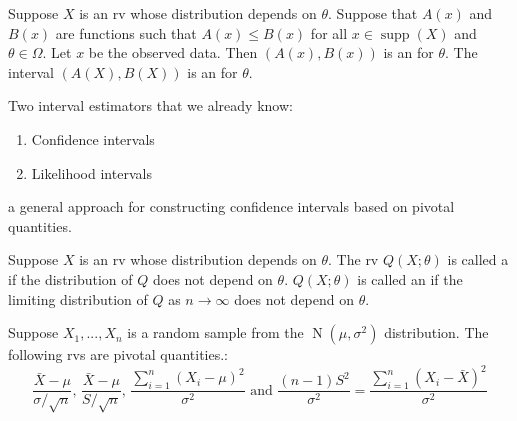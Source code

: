 \documentclass[notoc,notitlepage]{tufte-book}
\DeclareMathOperator{\Nor}{N }
\DeclareMathOperator{\supp}{supp }
\begin{document}
\begin{defn}
\label{defn:interval_estimators}
  Suppose $X$ is an rv whose distribution depends on $\theta$. Suppose that $A(x)$ and $B(x)$ are functions such that $A(x) \leq B(x)$ for all $x \in \supp(X)$ and $\theta \in \Omega$. Let $x$ be the observed data. Then $(A(x), B(x))$ is an  for $\theta$. The interval $(A(X), B(X))$ is an  for $\theta$.
\end{defn}

\begin{note}
  Two interval estimators that we already know:
  \begin{enumerate}
    \item Confidence intervals
    \item Likelihood intervals
  \end{enumerate}
\end{note}

 a general approach for constructing confidence intervals based on pivotal quantities.

\begin{defn}
\label{defn:pivotal_quantity}
  Suppose $X$ is an rv whose distribution depends on $\theta$. The rv $Q(X; \theta)$ is called a  if the distribution of $Q$ does not depend on $\theta$. $Q(X; \theta)$ is called an  if the limiting distribution of $Q$ as $n \to \infty$ does not depend on $\theta$.
\end{defn}

\begin{eg}[Example 6.16]\label{eg:6_16}
  Suppose $X_1, ..., X_n$ is a random sample from the $\Nor(\mu, \sigma^2)$ distribution. The following rvs are pivotal quantities.:
  \begin{equation*}
    \frac{\bar{X} - \mu}{\sigma / \sqrt{n}}, \, \frac{\bar{X} - \mu}{S / \sqrt{n}}, \, \frac{\sum\limits_{i=1}^{n} (X_i - \mu)^2}{\sigma^2} \text{ and } \frac{(n - 1) S^2}{\sigma^2} = \frac{\sum\limits_{i=1}^{n} (X_i - \bar{X})^2}{\sigma^2}
  \end{equation*}
\end{eg}
\end{document}
